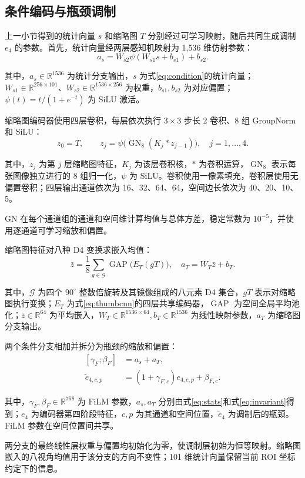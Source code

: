 \documentclass[UTF8,a4paper,zihao=5,fontset=fandol]{ctexart}
\newcommand{\op}[1]{\operatorname{#1}}
\newcommand{\sym}[1]{\par\nobreak\noindent\begin{minipage}{\linewidth}#1\end{minipage}\par}
\begin{document}
\subsection{条件编码与瓶颈调制}
上一小节得到的统计向量 $s$ 和缩略图 $T$ 分别经过可学习映射，随后共同生成调制 $e_4$ 的参数。首先，统计向量经两层感知机映射为 1,536 维仿射参数：
\begin{equation}
a_s=W_{s2}\psi(W_{s1}s+b_{s1})+b_{s2}.
\label{eq:stats}
\end{equation}
\sym{其中，$a_s\in\mathbb R^{1536}$ 为统计分支输出，$s$ 为式\eqref{eq:condition}的统计向量；$W_{s1}\in\mathbb R^{256\times101}$、$W_{s2}\in\mathbb R^{1536\times256}$ 为权重，$b_{s1},b_{s2}$ 为对应偏置；$\psi(t)=t/(1+e^{-t})$ 为 SiLU 激活。}

缩略图编码器使用四层卷积，每层依次执行 $3\times3$ 步长 2 卷积、8 组 GroupNorm\cite{groupnorm}和 SiLU：
\begin{equation}
z_0=T,\qquad z_j=\psi\bigl(\op{GN}_8(K_j*z_{j-1})\bigr),
\quad j=1,\ldots,4.
\label{eq:thumbcnn}
\end{equation}
\sym{其中，$z_j$ 为第 $j$ 层缩略图特征，$K_j$ 为该层卷积核，$*$ 为卷积运算，$\op{GN}_8$ 表示每张图像独立进行的 8 组归一化，$\psi$ 为 SiLU。卷积使用一像素填充，卷积层使用无偏置卷积；四层输出通道依次为 16、32、64、64，空间边长依次为 40、20、10、5。}
GN 在每个通道组的通道和空间维计算均值与总体方差，稳定常数为 $10^{-5}$，并使用逐通道可学习缩放和偏置。

缩略图特征对八种 D4 变换求嵌入均值：
\begin{equation}
\bar z=\frac{1}{8}\sum_{g\in\mathcal G}\op{GAP}\bigl(E_T(gT)\bigr),
\quad a_T=W_T\bar z+b_T.
\label{eq:invariant}
\end{equation}
\sym{其中，$\mathcal G$ 为四个 $90^\circ$ 整数倍旋转及其镜像组成的八元素 D4 集合，$gT$ 表示对缩略图执行变换；$E_T$ 为式\eqref{eq:thumbcnn}的四层共享编码器，$\op{GAP}$ 为空间全局平均池化；$\bar z\in\mathbb R^{64}$ 为平均嵌入，$W_T\in\mathbb R^{1536\times64},b_T\in\mathbb R^{1536}$ 为线性映射参数，$a_T$ 为缩略图分支输出。}

两个条件分支相加并拆分为瓶颈的缩放和偏置：
\begin{equation}
\begin{aligned}
{}[\gamma_F;\beta_F]&=a_s+a_T,\\
\widetilde e_{4,c,p}&=(1+\gamma_{F,c})e_{4,c,p}+\beta_{F,c}.
\end{aligned}
\label{eq:film}
\end{equation}
\sym{其中，$\gamma_F,\beta_F\in\mathbb R^{768}$ 为 FiLM 参数，$a_s,a_T$ 分别由式\eqref{eq:stats}和式\eqref{eq:invariant}得到；$e_4$ 为编码器第四阶段特征，$c,p$ 为其通道和空间位置，$\widetilde e_4$ 为调制后的瓶颈。FiLM 参数在空间位置间共享。}
两分支的最终线性层权重与偏置均初始化为零，使调制层初始为恒等映射。缩略图嵌入的八视角均值用于该分支的方向不变性；101 维统计向量保留当前 ROI 坐标约定下的信息。
\end{document}
